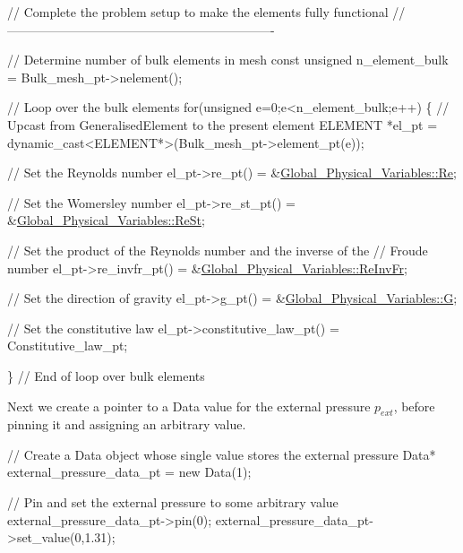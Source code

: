 \begin{DoxyCodeInclude}
 \textcolor{comment}{// Complete the problem setup to make the elements fully functional}
 \textcolor{comment}{// ----------------------------------------------------------------}
 
 \textcolor{comment}{// Determine number of bulk elements in mesh}
 \textcolor{keyword}{const} \textcolor{keywordtype}{unsigned} n\_element\_bulk = Bulk\_mesh\_pt->nelement();

 \textcolor{comment}{// Loop over the bulk elements}
 \textcolor{keywordflow}{for}(\textcolor{keywordtype}{unsigned} e=0;e<n\_element\_bulk;e++)
  \{
   \textcolor{comment}{// Upcast from GeneralisedElement to the present element}
   ELEMENT *el\_pt = \textcolor{keyword}{dynamic\_cast<}ELEMENT*\textcolor{keyword}{>}(Bulk\_mesh\_pt->element\_pt(e));

   \textcolor{comment}{// Set the Reynolds number}
   el\_pt->re\_pt() = &\hyperlink{namespaceGlobal__Physical__Variables_ab814e627d2eb5bc50318879d19ab16b9}{Global\_Physical\_Variables::Re};

   \textcolor{comment}{// Set the Womersley number}
   el\_pt->re\_st\_pt() = &\hyperlink{namespaceGlobal__Physical__Variables_a085ee4bf968ffdd01a41b8c41864f907}{Global\_Physical\_Variables::ReSt};

   \textcolor{comment}{// Set the product of the Reynolds number and the inverse of the}
   \textcolor{comment}{// Froude number}
   el\_pt->re\_invfr\_pt() = &\hyperlink{namespaceGlobal__Physical__Variables_aa6286f02b476912dd7550eced538331a}{Global\_Physical\_Variables::ReInvFr};

   \textcolor{comment}{// Set the direction of gravity}
   el\_pt->g\_pt() = &\hyperlink{namespaceGlobal__Physical__Variables_a37a6f46efcb35b4bd12c73f19d741020}{Global\_Physical\_Variables::G};

   \textcolor{comment}{// Set the constitutive law}
   el\_pt->constitutive\_law\_pt() = Constitutive\_law\_pt;

  \} \textcolor{comment}{// End of loop over bulk elements}

\end{DoxyCodeInclude}


Next we create a pointer to a {\ttfamily Data} value for the external pressure $ p_{ext} $, before pinning it and assigning an arbitrary value.


\begin{DoxyCodeInclude}
 \textcolor{comment}{// Create a Data object whose single value stores the external pressure}
 Data* external\_pressure\_data\_pt = \textcolor{keyword}{new} Data(1);
 
 \textcolor{comment}{// Pin and set the external pressure to some arbitrary value}
 external\_pressure\_data\_pt->pin(0);
 external\_pressure\_data\_pt->set\_value(0,1.31);

\end{DoxyCodeInclude}


